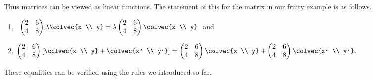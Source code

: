 \noindent
Thus
\hypertarget{Matrices are linear operators}{matrices can be viewed as linear functions.} 
The statement of this for the matrix in our fruity example is as follows.
\begin{enumerate}
\item\label{ITEM1}~$\begin{pmatrix}
      2             &6 \\
      4            &8
    \end{pmatrix}
   \lambda \colvec{x \\ y} 
   =\lambda  \begin{pmatrix}
      2             &6 \\
      4            &8
    \end{pmatrix}
   \colvec{x \\ y} ~$ and
\item\label{ITEM2}
$     \begin{pmatrix}
      2             &6 \\
      4            &8
    \end{pmatrix}
   \left[ \colvec{x \\ y} +\colvec{x' \\ y'} \right] 
   = \begin{pmatrix}
      2             &6 \\
      4            &8
    \end{pmatrix}
\colvec{x \\ y}
   +
    \begin{pmatrix}
      2             &6 \\
      4            &8
    \end{pmatrix}
    \colvec{x' \\ y'}
.$
\end{enumerate}
These equalities can be verified using the rules we introduced so far.

